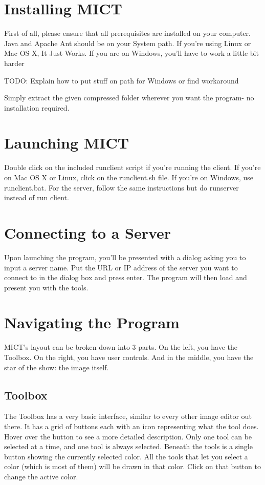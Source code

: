 \documentclass[11pt,oneside,a4paper]{article}
\begin{document}
\section{Installing MICT}
First of all, please ensure that all prerequisites are installed on your
computer. Java and Apache Ant should be on your System path. If you're using
Linux or Mac OS X, It Just Works\texttrademark. If you are on Windows, you'll
have to work a little bit harder

TODO: Explain how to put stuff on path for Windows or find workaround

Simply extract the given compressed folder wherever you want the program- no
installation required.

\section{Launching MICT}
Double click on the included runclient script if you're running the client. If
you're on Mac OS X or Linux, click on the runclient.sh file. If you're on
Windows, use runclient.bat. For the server, follow the same instructions but
do runserver instead of run client.

\section{Connecting to a Server}
Upon launching the program, you'll be presented with a dialog asking you to
input a server name. Put the URL or IP address of the server you want to
connect to in the dialog box and press enter. The program will then load and
present you with the tools.

\section{Navigating the Program}
MICT's layout can be broken down into 3 parts. On the left, you have the
Toolbox. On the right, you have user controls. And in the middle, you have the
star of the show: the image itself.
\subsection{Toolbox}
The Toolbox has a very basic interface, similar to every other image editor out
there. It has a grid of buttons each with an icon representing what the tool
does. Hover over the button to see a more detailed description. Only one tool
can be selected at a time, and one tool is always selected. Beneath the tools
is a single button showing the currently selected color. All the tools that let
you select a color (which is most of them) will be drawn in that color. Click
on that button to change the active color.
\end{document}
